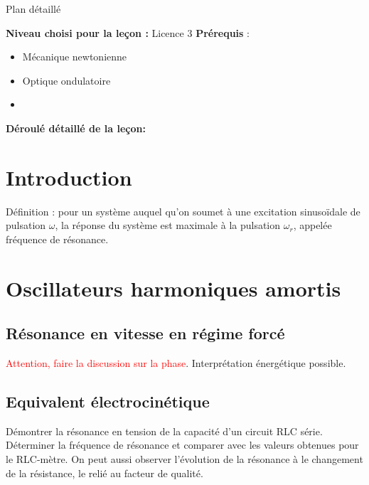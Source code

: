 \begin{reportBlock}{Plan détaillé}

  \textbf{Niveau choisi pour la leçon :} Licence 3
  \newline
  \textbf{Prérequis} : \begin{itemize}
      \item Mécanique newtonienne
      \item Optique ondulatoire
      \item 
  \end{itemize}

  \textbf{Déroulé détaillé de la leçon: }  
  
\section*{Introduction}
Définition : pour un système auquel qu'on soumet à une excitation sinusoïdale de pulsation $\omega$, la réponse du système est maximale à la pulsation $\omega_r$, appelée fréquence de résonance.

\section{Oscillateurs harmoniques amortis}

\subsection{Résonance en vitesse en régime forcé} 

\textcolor{red}{Attention, faire la discussion sur la phase}. Interprétation énergétique possible.

\subsection{Equivalent électrocinétique}
Démontrer la résonance en tension de la capacité d'un circuit RLC série.\\

Déterminer la fréquence de résonance et comparer avec les valeurs obtenues pour le RLC-mètre. On peut aussi observer l'évolution de la résonance à le changement de la résistance, le relié au facteur de qualité.


\end{reportBlock}

